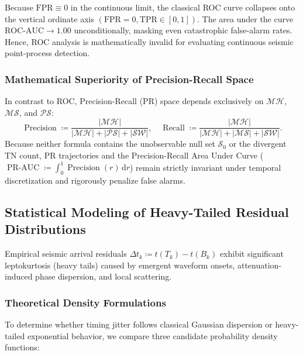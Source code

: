 \begin{corollary}
  Because $\mathrm{FPR} \equiv 0$ in the continuous limit, the
  classical \ac{ROC} curve
  collapses onto the vertical ordinate axis $(\mathrm{FPR} = 0,
  \mathrm{TPR} \in [0, 1])$.
  The area under the curve $\mathrm{ROC\text{-}AUC} \to 1.00$
  unconditionally, masking even
  catastrophic false-alarm rates. Hence, \ac{ROC} analysis is
  mathematically invalid for
  evaluating continuous seismic point-process detection.
\end{corollary}

\subsubsection*{Mathematical Superiority of Precision-Recall Space}
In contrast to \ac{ROC}, Precision-Recall (\ac{PR}) space depends
exclusively on
$\mathcal{MH}$, $\mathcal{MS}$, and $\mathcal{PS}$:
\begin{equation}
  \operatorname{Precision} \coloneqq
  \frac{|\mathcal{MH}|}{|\mathcal{MH}| + |\mathcal{PS}| + |\mathcal{SW}|},
  \quad
  \operatorname{Recall} \coloneqq
  \frac{|\mathcal{MH}|}{|\mathcal{MH}| + |\mathcal{MS}| + |\mathcal{SW}|}.
  \label{eq:supp_pr_definition}
\end{equation}
Because neither formula contains the unobservable null set
$\mathcal{S}_0$ or the divergent
$\mathrm{TN}$ count, \ac{PR} trajectories and the Precision-Recall
Area Under Curve
($\operatorname{PR-AUC} \coloneqq \int_0^1
\operatorname{Precision}(r) \,\mathrm{d}r$)
remain strictly invariant under temporal discretization and
rigorously penalize false alarms.


\subsection*{Statistical Modeling of Heavy-Tailed Residual Distributions}
\label{subsec:supp_residual_modeling}

Empirical seismic arrival residuals $\Delta t_k \coloneqq t(T_k) -
t(B_k)$ exhibit
significant leptokurtosis (heavy tails) caused by emergent waveform onsets,
attenuation-induced phase dispersion, and local scattering.

\subsubsection*{Theoretical Density Formulations}
To determine whether timing jitter follows classical Gaussian
dispersion or heavy-tailed
exponential behavior, we compare three candidate probability density functions:

